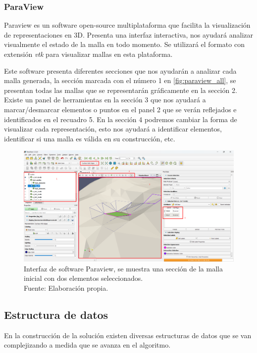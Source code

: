 \subsubsection{ParaView}

Paraview es un software open-source multiplataforma que facilita la visualización de representaciones en 3D. Presenta una interfaz interactiva, nos ayudará analizar visualmente el estado de la malla en todo momento. Se utilizará el formato con extensión \textit{vtk} para visualizar mallas en esta plataforma.

Este software presenta diferentes secciones que nos ayudarán a analizar cada malla generada, la sección marcada con el número 1 en \autoref{fig:paraview_all}, se presentan todas las mallas que se representarán gráficamente en la sección 2. Existe un panel de herramientas en la sección 3 que nos ayudará a marcar/desmarcar elementos o puntos en el panel 2 que se verán reflejados e identificados en el recuadro 5.
En la sección 4 podremos cambiar la forma de visualizar cada representación, esto nos ayudará a identificar elementos, identificar si una malla es válida en su construcción, etc.

\begin{figure}[!ht]
    \centering
    \includegraphics[width=1.0\textwidth]{figures/paraview/paraview_all.png}
    \caption{ Interfaz de software Paraview, se muestra una sección de la malla inicial con dos elementos seleccionados.\\  Fuente: Elaboración propia.}
    \label{fig:paraview_all}
\end{figure}

\subsection{Estructura de datos}

En la construcción de la solución existen diversas estructuras de datos que se van complejizando a medida que se avanza en el algoritmo.

